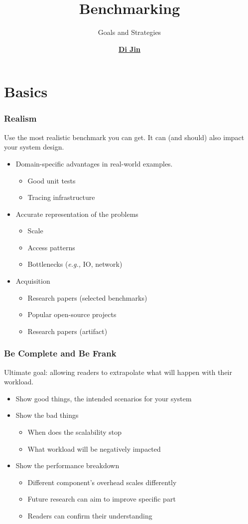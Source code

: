\documentclass[xcolor={dvipsnames},aspectratio=149]{beamer}
\title[Benchmarking]
{
  Benchmarking
}
\subtitle
{
  Goals and Strategies
}
\author[\href{mailto:di_jin@brown.edu}{Di Jin}]
{
  \href{https://sleepymug.me/}{\textbf{Di Jin}}
}
\date[CSCI2952R]			%
{
}
\def\eg{\emph{e.g.,}\xspace}
\begin{document}
\begin{frame}
\titlepage
\end{frame}

\section{Basics}
\begin{frame}
  \frametitle{Realism}
  Use the most realistic benchmark you can get. It can (and should) also impact your system design.
  \begin{itemize}
  \item Domain-specific advantages in real-world examples.
    \begin{itemize}
    \item Good unit tests
    \item Tracing infrastructure
    \end{itemize}
  \item Accurate representation of the problems
    \begin{itemize}
    \item Scale
    \item Access patterns
    \item Bottlenecks (\eg IO, network)
    \end{itemize}
  \item Acquisition
    \begin{itemize}
    \item Research papers (selected benchmarks)
    \item Popular open-source projects
    \item Research papers (artifact)
    \end{itemize}
  \end{itemize}
\end{frame}

\begin{frame}
  \frametitle{Be Complete and Be Frank}
  Ultimate goal: allowing readers to extrapolate what will happen with their workload.
  \begin{itemize}
  \item Show good things, the intended scenarios for your system
  \item Show the bad things
    \begin{itemize}
    \item When does the scalability stop
    \item What workload will be negatively impacted
    \end{itemize}
  \item Show the performance breakdown
    \begin{itemize}
    \item Different component's overhead scales differently
    \item Future research can aim to improve specific part
    \item Readers can confirm their understanding
    \end{itemize}
  \end{itemize}
\end{frame}
\end{document}
